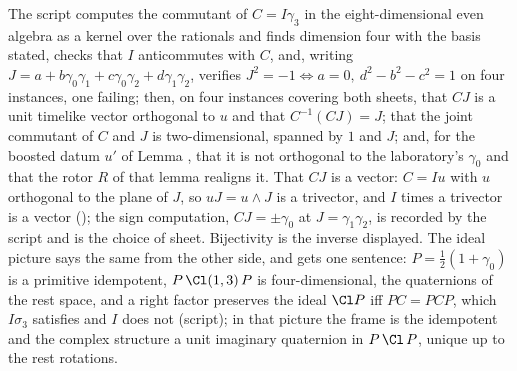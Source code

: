 The script computes the commutant of $C = I\gamma_{3}$ in the eight-dimensional even algebra as a kernel over the rationals and finds dimension four with the basis stated, checks that $I$ anticommutes with $C$, and, writing $J = a + b\gamma_{0}\gamma_{1} + c\gamma_{0}\gamma_{2} + d\gamma_{1}\gamma_{2}$, verifies $J^{2} = -1 \iff a = 0,\ d^{2} - b^{2} - c^{2} = 1$ on four instances, one failing; then, on four instances covering both sheets, that $CJ$ is a unit timelike vector orthogonal to $u$ and that $C^{-1}(CJ) = J$; that the joint commutant of $C$ and $J$ is two-dimensional, spanned by $1$ and $J$; and, for the boosted datum $u'$ of Lemma , that it is not orthogonal to the laboratory's $\gamma_{0}$ and that the rotor $R$ of that lemma realigns it. That $CJ$ is a vector: $C = Iu$ with $u$ orthogonal to the plane of $J$, so $uJ = u \wedge J$ is a trivector, and $I$ times a trivector is a vector (); the sign computation, $CJ = \pm\gamma_{0}$ at $J = \gamma_{1}\gamma_{2}$, is recorded by the script and is the choice of sheet. Bijectivity is the inverse displayed. The ideal picture says the same from the other side, and gets one sentence: $P = \tfrac12(1 + \gamma_{0})$ is a primitive idempotent, $P\,\Cl(1,3)\,P$ is four-dimensional, the quaternions of the rest space, and a right factor preserves the ideal $\Cl P$ iff $PC = PCP$, which $I\sigma_{3}$ satisfies and $I$ does not (script); in that picture the frame is the idempotent and the complex structure a unit imaginary quaternion in $P\,\Cl\,P$, unique up to the rest rotations.
